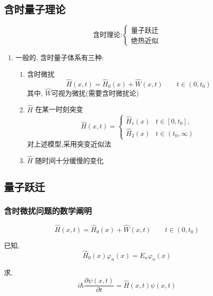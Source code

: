 \documentclass[a4paper, 11pt]{article}
\begin{document}
\begin{spacing}{1.2}
    \section{含时量子理论}
      $$\text{含时理论:} 
        \begin{cases}
          \text{量子跃迁}\\
          \text{绝热近似}
        \end{cases}$$
      \begin{enumerate}[]
        \item 一般的, 含时量子体系有三种:
        \begin{enumerate}[-i-]
          \item 含时微扰
            \begin{equation}
              \hat{H}(x, t) = \hat{H}_0(x) + \hat{W}(x,t) 
                            \qquad t\in(0, t_0)
            \end{equation}
               其中, $\hat{W}$可视为微扰(需要含时微扰论)
          \item $\hat{H}$ 在某一时刻突变
                $$\hat{H}(x, t) = 
                \begin{cases}
                  \hat{H}_1(x) & t \in [0, t_0],\\
                  \hat{H}_2(x) & t \in (t_0, \infty)
                \end{cases}$$
                对上述模型,采用突变近似法
          \item $\hat{H}$ 随时间十分缓慢的变化
        \end{enumerate}
      \end{enumerate}
      
      \subsection{量子跃迁}
        \subsubsection{含时微扰问题的数学阐明}
          \begin{equation}
            \hat{H}(x, t) = \hat{H}_0(x) + \hat{W}(x,t) 
                            \qquad t\in(0, t_0)
          \end{equation}

          已知, 
          \begin{equation}
            \hat{H}_0(x)\varphi_n(x) = E_n\varphi_n(x) 
          \end{equation} 
          \par 求,
          \begin{equation}
            \label{Hwithtime}
            i\hbar\frac{\partial \psi(x, t)}{\partial t} = 
            \hat{H}(x, t)\psi(x, t)
          \end{equation}


\end{spacing}
\end{document}
